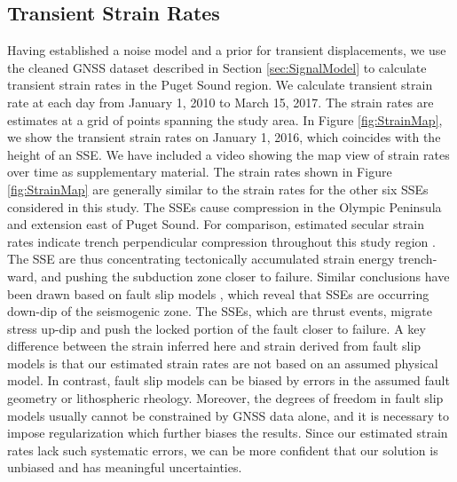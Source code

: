 \documentclass[10pt,letter]{article}
\begin{document}
\subsection{Transient Strain Rates} 
Having established a noise model and a prior for transient displacements, we use the cleaned GNSS dataset described in Section \ref{sec:SignalModel} to calculate transient strain rates in the Puget Sound region.  We calculate transient strain rate at each day from January 1, 2010 to March 15, 2017. The strain rates are estimates at a grid of points spanning the study area. In Figure \ref{fig:StrainMap}, we show the transient strain rates on January 1, 2016, which coincides with the height of an SSE. We have included a video showing the map view of strain rates over time as supplementary material. The strain rates shown in Figure \ref{fig:StrainMap} are generally similar to the strain rates for the other six SSEs considered in this study. The SSEs cause compression in the Olympic Peninsula and extension east of Puget Sound. For comparison, estimated secular strain rates indicate trench perpendicular compression throughout this study region \citep{Murray2000,McCaffrey2007,McCaffrey2013}. The SSE are thus concentrating tectonically accumulated strain energy trench-ward, and pushing the subduction zone closer to failure. Similar conclusions have been drawn based on fault slip models \citep[e.g.,][]{Dragert2001,Wech2009,Schmidt2010}, which reveal that SSEs are occurring down-dip of the seismogenic zone. The SSEs, which are thrust events, migrate stress up-dip and push the locked portion of the fault closer to failure. A key difference between the strain inferred here and strain derived from fault slip models is that our estimated strain rates are not based on an assumed physical model. In contrast, fault slip models can be biased by errors in the assumed fault geometry or lithospheric rheology. Moreover, the degrees of freedom in fault slip models usually cannot be constrained by GNSS data alone, and it is necessary to impose regularization which further biases the results. Since our estimated strain rates lack such systematic errors, we can be more confident that our solution is unbiased and has meaningful uncertainties.  
\end{document}
